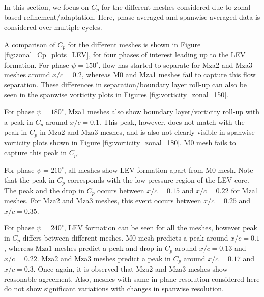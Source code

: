 
In this section, we focus on $C_p$ for the different meshes considered due to zonal-based refinement/adaptation. Here, phase averaged and spanwise averaged data is considered over multiple cycles.

A comparison of $C_p$ for the different meshes is shown in Figure \ref{fig:zonal_Cp_plots_LEV}, for four phases of interest leading up to the LEV formation. For phase $\psi=150^\circ$, flow has started to separate for Mza2 and Mza3 meshes around $x/c = 0.2$, whereas M0 and Mza1 meshes fail to capture this flow separation. These differences in separation/boundary layer roll-up can also be seen in the spanwise vorticity plots in Figures \ref{fig:vorticity_zonal_150}.

For phase $\psi=180^\circ$, Mza1 meshes also show boundary layer/vorticity roll-up with a peak in $C_p$ around $x/c = 0.1$. This peak, however, does not match with the peak in $C_p$ in Mza2 and Mza3 meshes, and is also not clearly visible in spanwise vorticity plots shown in Figure \ref{fig:vorticity_zonal_180}. M0 mesh fails to capture this peak in $C_p$. 


For phase $\psi=210^\circ$, all meshes show LEV formation apart from M0 mesh. Note that the peak in $C_p$ corresponds with the low pressure region of the LEV core. The peak and the drop in $C_p$ occurs between $x/c=0.15$ and $x/c=0.22$ for Mza1 meshes. For Mza2 and Mza3 meshes, this event occurs between $x/c=0.25$ and $x/c=0.35$.

For phase $\psi=240^\circ$, LEV formation can be seen for all the meshes, however peak in $C_p$ differs between different meshes. M0 mesh predicts a peak around $x/c=0.1$, whereas Mza1 meshes predict a peak and drop in $C_p$ around $x/c=0.13$ and $x/c=0.22$. Mza2 and Mza3 meshes predict a peak in $C_p$ around $x/c=0.17$ and $x/c=0.3$. Once again, it is observed that Mza2 and Mza3 meshes show reasonable agreement. Also, meshes with same in-plane resolution considered here do not show significant variations with changes in spanwise resolution.




